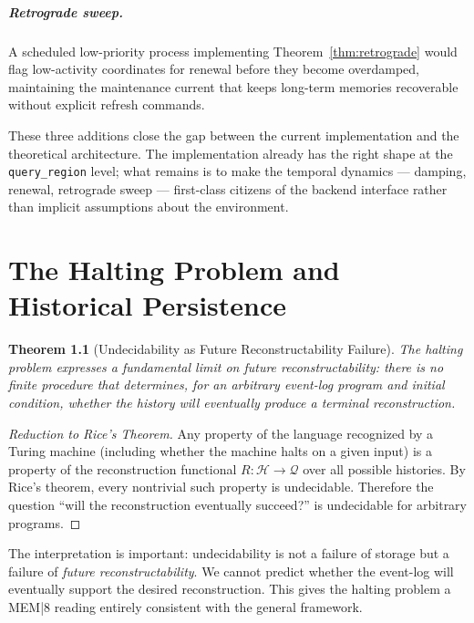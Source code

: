 \documentclass[12pt, oneside]{book}
\theoremstyle{plain}
\newtheorem{theorem}{Theorem}[chapter]
\theoremstyle{definition}
\theoremstyle{remark}
\newcommand{\calH}{\mathcal{H}}
\newcommand{\calQ}{\mathcal{Q}}
\begin{document}
\paragraph{Retrograde sweep.}
A scheduled low-priority process implementing
Theorem~\ref{thm:retrograde} would flag low-activity
coordinates for renewal before they become overdamped,
maintaining the maintenance current that keeps long-term
memories recoverable without explicit refresh commands.

These three additions close the gap between the current
implementation and the theoretical architecture.
The implementation already has the right shape at the
\texttt{query\_region} level; what remains is to make the
temporal dynamics --- damping, renewal, retrograde sweep ---
first-class citizens of the backend interface rather than
implicit assumptions about the environment.


\chapter{The Halting Problem and Historical Persistence}

\begin{theorem}[Undecidability as Future Reconstructability Failure]
The halting problem expresses a fundamental limit on
future reconstructability: there is no finite procedure
that determines, for an arbitrary event-log program and
initial condition, whether the history will eventually
produce a terminal reconstruction.
\end{theorem}

\begin{proof}[Reduction to Rice's Theorem]
Any property of the language recognized by a Turing machine
(including whether the machine halts on a given input)
is a property of the reconstruction functional
$R : \calH \to \calQ$ over all possible histories.
By Rice's theorem, every nontrivial such property is
undecidable.
Therefore the question ``will the reconstruction eventually
succeed?'' is undecidable for arbitrary programs.
\end{proof}

The interpretation is important: undecidability is not
a failure of storage but a failure of
\emph{future reconstructability}.
We cannot predict whether the event-log will eventually
support the desired reconstruction.
This gives the halting problem a MEM|8 reading entirely
consistent with the general framework.
\end{document}
